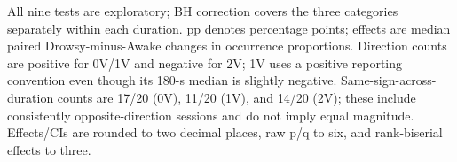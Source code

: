 \begin{table}[p]
\centering
\scriptsize
\setlength{\tabcolsep}{3pt}
\renewcommand{\arraystretch}{1.12}
\caption{Symbolic supporting results.}
\label{tab:supp_symbolic}
\par\medskip
\begin{minipage}{\textwidth}\footnotesize
All nine tests are exploratory; BH correction covers the three categories separately within each duration. pp denotes percentage points; effects are median paired Drowsy-minus-Awake changes in occurrence proportions. Direction counts are positive for 0V/1V and negative for 2V; 1V uses a positive reporting convention even though its 180-s median is slightly negative. Same-sign-across-duration counts are 17/20 (0V), 11/20 (1V), and 14/20 (2V); these include consistently opposite-direction sessions and do not imply equal magnitude. Effects/CIs are rounded to two decimal places, raw p/q to six, and rank-biserial effects to three.
\end{minipage}
\end{table}
